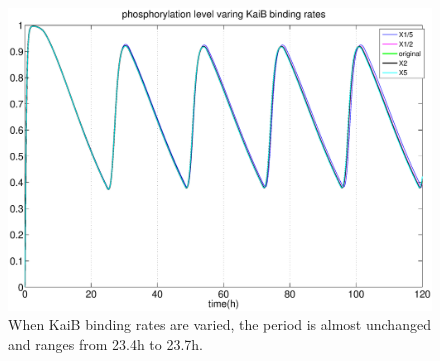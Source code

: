 \documentclass[a4paper,10pt]{article}
\numberwithin{equation}{section}
\begin{document}

\begin{figure}[H]
\centering
\includegraphics[scale=0.45]{tempcomp1.eps}
\caption{\selectfont When KaiB binding rates are varied, the period is almost unchanged and ranges from 23.4h to 23.7h.}\label{fig:varyb}
\end{figure}

\end{document}
